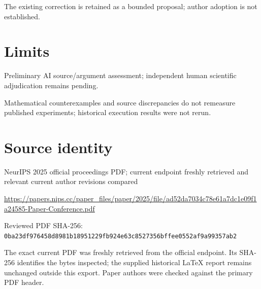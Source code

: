\documentclass[11pt]{article}
\begin{document}
The existing correction is retained as a bounded proposal; author adoption is not established.

\section*{Limits}

Preliminary AI source/argument assessment; independent human scientific adjudication remains pending.\par

Mathematical counterexamples and source discrepancies do not remeasure published experiments; historical execution results were not rerun.\par

\section*{Source identity}

NeurIPS 2025 official proceedings PDF; current endpoint freshly retrieved and relevant current author revisions compared

\url{https://papers.nips.cc/paper_files/paper/2025/file/ad52da7034c78e61a7dc1e09f1a24585-Paper-Conference.pdf}

Reviewed PDF SHA-256: \nolinkurl{0ba23df976458d8981b18951229fb924e63c8527356bffee0552af9a99357ab2}

The exact current PDF was freshly retrieved from the official endpoint. Its SHA-256 identifies the bytes inspected; the supplied historical LaTeX report remains unchanged outside this export. Paper authors were checked against the primary PDF header.
\end{document}
